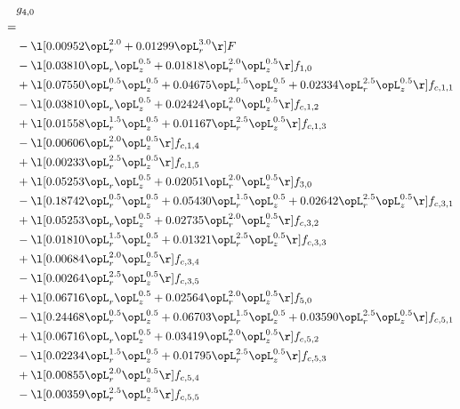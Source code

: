 \begin{alignat}{2} 
\label{eq:g_40_0} 
& g_{4,0} \nonumber \\ 
 = \\ 
& - \l[  0.00952 \opL_r^{2.0} +  0.01299 \opL_r^{3.0}  \r] F \nonumber \\ 
& - \l[  0.03810 \opL_r \opL_z^{0.5} +  0.01818 \opL_r^{2.0} \opL_z^{0.5}  \r] f_{1,0} \nonumber \\ 
& + \l[  0.07550 \opL_r^{0.5} \opL_z^{0.5} +  0.04675 \opL_r^{1.5} \opL_z^{0.5} +  0.02334 \opL_r^{2.5} \opL_z^{0.5}  \r] f_{c,1,1} \nonumber \\ 
& - \l[  0.03810 \opL_r \opL_z^{0.5} +  0.02424 \opL_r^{2.0} \opL_z^{0.5}  \r] f_{c,1,2} \nonumber \\ 
& + \l[  0.01558 \opL_r^{1.5} \opL_z^{0.5} +  0.01167 \opL_r^{2.5} \opL_z^{0.5}  \r] f_{c,1,3} \nonumber \\ 
& - \l[  0.00606 \opL_r^{2.0} \opL_z^{0.5}  \r] f_{c,1,4} \nonumber \\ 
& + \l[  0.00233 \opL_r^{2.5} \opL_z^{0.5}  \r] f_{c,1,5} \nonumber \\ 
& + \l[  0.05253 \opL_r \opL_z^{0.5} +  0.02051 \opL_r^{2.0} \opL_z^{0.5}  \r] f_{3,0} \nonumber \\ 
& - \l[  0.18742 \opL_r^{0.5} \opL_z^{0.5} +  0.05430 \opL_r^{1.5} \opL_z^{0.5} +  0.02642 \opL_r^{2.5} \opL_z^{0.5}  \r] f_{c,3,1} \nonumber \\ 
& + \l[  0.05253 \opL_r \opL_z^{0.5} +  0.02735 \opL_r^{2.0} \opL_z^{0.5}  \r] f_{c,3,2} \nonumber \\ 
& - \l[  0.01810 \opL_r^{1.5} \opL_z^{0.5} +  0.01321 \opL_r^{2.5} \opL_z^{0.5}  \r] f_{c,3,3} \nonumber \\ 
& + \l[  0.00684 \opL_r^{2.0} \opL_z^{0.5}  \r] f_{c,3,4} \nonumber \\ 
& - \l[  0.00264 \opL_r^{2.5} \opL_z^{0.5}  \r] f_{c,3,5} \nonumber \\ 
& + \l[  0.06716 \opL_r \opL_z^{0.5} +  0.02564 \opL_r^{2.0} \opL_z^{0.5}  \r] f_{5,0} \nonumber \\ 
& - \l[  0.24468 \opL_r^{0.5} \opL_z^{0.5} +  0.06703 \opL_r^{1.5} \opL_z^{0.5} +  0.03590 \opL_r^{2.5} \opL_z^{0.5}  \r] f_{c,5,1} \nonumber \\ 
& + \l[  0.06716 \opL_r \opL_z^{0.5} +  0.03419 \opL_r^{2.0} \opL_z^{0.5}  \r] f_{c,5,2} \nonumber \\ 
& - \l[  0.02234 \opL_r^{1.5} \opL_z^{0.5} +  0.01795 \opL_r^{2.5} \opL_z^{0.5}  \r] f_{c,5,3} \nonumber \\ 
& + \l[  0.00855 \opL_r^{2.0} \opL_z^{0.5}  \r] f_{c,5,4} \nonumber \\ 
& - \l[  0.00359 \opL_r^{2.5} \opL_z^{0.5}  \r] f_{c,5,5} \nonumber \\ 
\end{alignat} 


